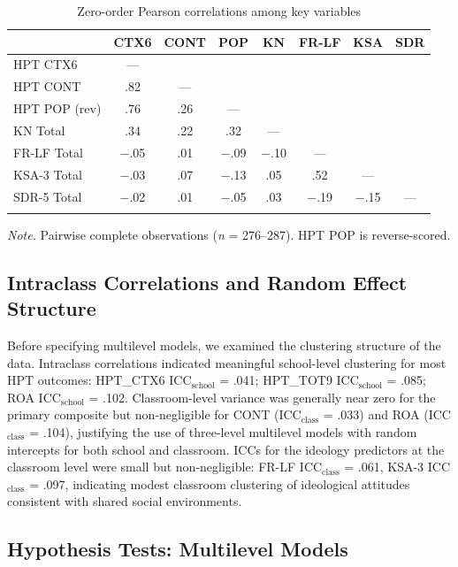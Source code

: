 \documentclass[referee,pdflatex,sn-apa]{sn-jnl}
\begin{document}
\begin{table}[!t]
\caption{Zero-order Pearson correlations among key variables}\label{tab:correlations}
\begin{tabular}{lccccccc}
\toprule
 & CTX6 & CONT & POP & KN & FR-LF & KSA & SDR \\
\midrule
HPT CTX6 & --- &  &  &  &  &  &  \\
HPT CONT & .82 & --- &  &  &  &  &  \\
HPT POP (rev) & .76 & .26 & --- &  &  &  &  \\
KN Total & .34 & .22 & .32 & --- &  &  &  \\
FR-LF Total & $-$.05 & .01 & $-$.09 & $-$.10 & --- &  &  \\
KSA-3 Total & $-$.03 & .07 & $-$.13 & .05 & .52 & --- &  \\
SDR-5 Total & $-$.02 & .01 & $-$.05 & .03 & $-$.19 & $-$.15 & --- \\
\botrule
\end{tabular}

\medskip\noindent\small\textit{Note.} Pairwise complete observations (\textit{n} = 276--287). HPT POP is reverse-scored.
\end{table}

\subsection{Intraclass Correlations and Random Effect Structure}\label{subsec:icc}

Before specifying multilevel models, we examined the clustering structure of the data. Intraclass correlations indicated meaningful school-level clustering for most HPT outcomes: HPT\_CTX6 ICC$_{\text{school}}$ = .041; HPT\_TOT9 ICC$_{\text{school}}$ = .085; ROA ICC$_{\text{school}}$ = .102. Classroom-level variance was generally near zero for the primary composite but non-negligible for CONT (ICC$_{\text{class}}$ = .033) and ROA (ICC$_{\text{class}}$ = .104), justifying the use of three-level multilevel models with random intercepts for both school and classroom. ICCs for the ideology predictors at the classroom level were small but non-negligible: FR-LF ICC$_{\text{class}}$ = .061, KSA-3 ICC$_{\text{class}}$ = .097, indicating modest classroom clustering of ideological attitudes consistent with shared social environments.

\subsection{Hypothesis Tests: Multilevel Models}\label{subsec:mlm}
\end{document}
